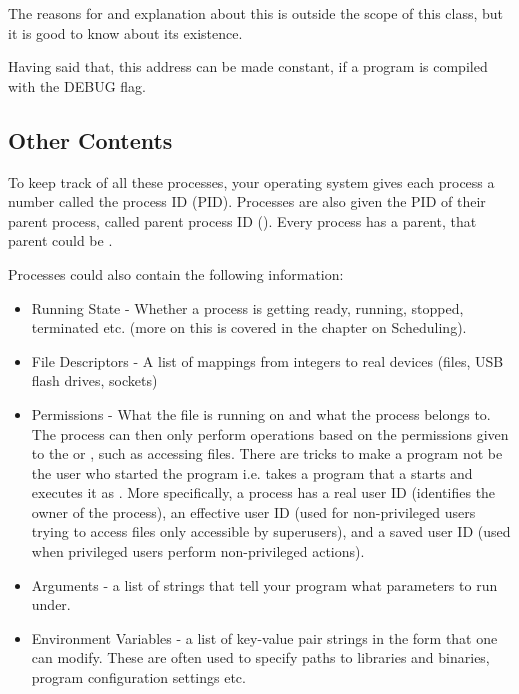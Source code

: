 \begin{itemize}
\begin{itemize}
        The reasons for and explanation about this is outside the scope of this class, but it is good to know about its existence.

        Having said that, this address can be made constant, if a program is compiled with the DEBUG flag.
\end{itemize}

\subsection{Other Contents}

To keep track of all these processes, your operating system gives each process a number called the process ID (PID).
Processes are also given the PID of their parent process, called parent process ID ().
Every process has a parent, that parent could be .

Processes could also contain the following information:

\begin{itemize}
\item Running State - Whether a process is getting ready, running, stopped, terminated etc. (more on this is covered in the chapter on Scheduling).
\item File Descriptors - A list of mappings from integers to real devices (files, USB flash drives, sockets)
\item Permissions - What  the file is running on and what  the process belongs to.
  The process can then only perform operations based on the permissions given to the  or , such as accessing files.
  There are tricks to make a program not be the user who started the program i.e.  takes a program that a  starts and executes it as .
    More specifically, a process has a real user ID (identifies the owner of the process), an effective user ID (used for non-privileged users trying to access files only accessible by superusers), and a saved user ID (used when privileged users perform non-privileged actions). 
\item Arguments - a list of strings that tell your program what parameters to run under.
\item Environment Variables - a list of key-value pair strings in the form  that one can modify. These are often used to specify paths to libraries and binaries, program configuration settings etc.
\end{itemize}


\end{itemize}
